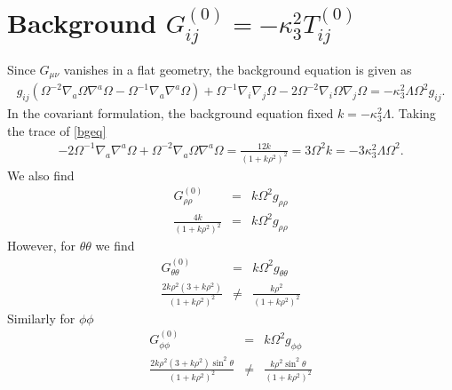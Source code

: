 \documentclass[10pt,letterpaper]{article}
\numberwithin{equation}{section}
\begin{document}
\section{Background $G^{(0)}_{ij} = - \kappa^2_3 T^{(0)}_{ij}$}
Since $G_{\mu\nu}$ vanishes in a flat geometry, the background equation is given as
\begin{eqnarray}
 g_{ij}( \Omega^{-2} \nabla_{a}\Omega \nabla^{a}\Omega -\Omega^{-1} \nabla_{a}\nabla^{a}\Omega)+  \Omega^{-1} \nabla_{i}\nabla_{j}\Omega - 2 \Omega^{-2} \nabla_{i}\Omega \nabla_{j}\Omega 
= -\kappa_3^2 \Lambda \Omega^2 g_{ij}. 
\label{bgeq}
\end{eqnarray}
In the covariant formulation, the background equation fixed $k = -\kappa_3^2\Lambda$. 
Taking the trace of \eqref{bgeq}
\begin{eqnarray}
-2\Omega^{-1} \nabla_a\nabla^a \Omega + \Omega^{-2} \nabla_a\Omega \nabla^a\Omega = \frac{12k}{(1+k\rho^2)^2} = 3\Omega^2 k =  -3\kappa_3^2 \Lambda \Omega^2 .
\end{eqnarray}
We also find
\begin{eqnarray}
G^{(0)}_{\rho\rho} &=& k\Omega^2 g_{\rho\rho}
\nonumber\\
\frac{4k}{(1+k\rho^2)^2} &=&  k\Omega^2 g_{\rho\rho}
\end{eqnarray}
However, for $\theta\theta$ we find
\begin{eqnarray}
G^{(0)}_{\theta\theta} &=& k\Omega^2 g_{\theta\theta}
\nonumber\\
\frac{2k\rho^2(3+k\rho^2)}{(1+k\rho^2)^2} &\ne &  \frac{k\rho^2}{(1+k\rho^2)^2}
\label{gbtt}
\end{eqnarray}
Similarly for $\phi\phi$
\begin{eqnarray}
G^{(0)}_{\phi\phi} &=& k\Omega^2 g_{\phi\phi}
\nonumber\\
\frac{2k\rho^2(3+k\rho^2)\sin^2\theta}{(1+k\rho^2)^2} &\ne &  \frac{k\rho^2\sin^2\theta}{(1+k\rho^2)^2}
\label{gbpp}
\end{eqnarray}

\end{document}
